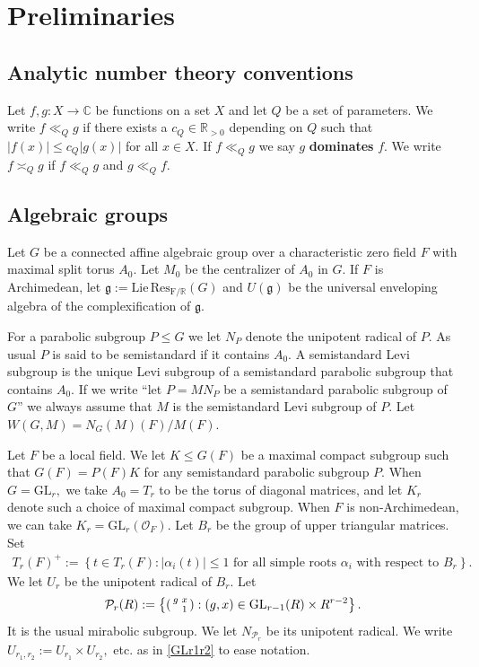 \documentclass[12pt]{amsart}
\theoremstyle{remark}
\numberwithin{equation}{section}
\newcommand{\GL}{\mathrm{GL}}
\newcommand{\OO}{\mathcal{O}}
\newcommand{\CC}{\mathbb{C}}
\newcommand{\RR}{\mathbb{R}}
\theoremstyle{definition}
\newenvironment{psmatrix}
  {\left(\begin{smallmatrix}}
  {\end{smallmatrix}\right)}
\numberwithin{equation}{subsection}
\begin{document}
\section{Preliminaries}
 \label{sec:AG:prelim}

\subsection{Analytic number theory conventions}
Let $f,g:X \to \CC$ be functions on a set $X$ and let $Q$ be a set of parameters.  We write $f \ll_{Q} g$ if there exists a $c_Q \in \RR_{>0}$ depending on $Q$ such that $|f(x)|\leq c_Q|g(x)|$ for all $x \in X.$  If $f \ll_Q g$ we say $g$ \textbf{dominates} $f.$  We write $f \asymp_Q g$ if $f \ll_Q g$ and $g \ll_Q f.$


\subsection{Algebraic groups}

Let $G$ be a connected affine algebraic group over a characteristic zero field $F$ with maximal split torus $A_0.$  Let $M_0$ be the centralizer of $A_0$ in $G.$ If $F$ is Archimedean, let $\mathfrak{g}:=\mathrm{Lie}\,\mathrm{Res_{F/\RR}}(G)$ and $U(\mathfrak{g})$ be the universal enveloping algebra of the complexification of $\mathfrak{g}.$

For a parabolic subgroup $P\leq G$ we let $N_P$ denote the unipotent radical of $P.$   As usual $P$ is said to be semistandard if it contains $A_0.$  A semistandard Levi subgroup is the unique Levi subgroup of a semistandard parabolic subgroup that contains $A_0.$  If we write ``let $P=MN_P$ be a semistandard parabolic subgroup of $G$'' we always assume that $M$ is the semistandard Levi subgroup of $P$.
Let $W(G,M)=N_{G}(M)(F)/M(F).$  

Let $F$ be a local field. We let $K \leq G(F)$ be a maximal compact subgroup such that $G(F)=P(F)K$ for any semistandard parabolic subgroup $P$. When $G=\GL_r,$ we take $A_0=T_r$ to be the torus of diagonal matrices, and let $K_r$ denote such a choice of maximal compact subgroup. When $F$ is non-Archimedean, we can take $K_r=\GL_r(\OO_F)$. Let $B_r$ be the group of upper triangular matrices. Set 
\begin{align} \label{+}
    T_r(F)^+:=\left\{t \in T_r(F):|\alpha_i(t)| \leq 1 \textrm{ for all simple roots }\alpha_i \textrm{ with respect to }B_r\right\}.
\end{align} 
We let  $U_r$ be the unipotent radical 
of $B_r$. Let 
\begin{align} \label{mira}
\mathcal{P}_r(R):=\left\{\begin{psmatrix} g & x\\ & 1 \end{psmatrix}: (g,x) \in \GL_{r-1}(R) \times R^{r-2}\right\}.
\end{align}
It is the usual mirabolic subgroup.  We let $N_{\mathcal{P}_r}$ be its unipotent radical. We write $U_{r_1,r_2}:=U_{r_1} \times U_{r_2},$ etc. as in \eqref{GLr1r2} to ease notation.
\end{document}
